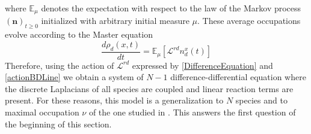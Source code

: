 \documentclass[10pt]{article}
\numberwithin{equation}{section}
\numberwithin{equation}{subsection}
\begin{document}
where $\mathbb{E}_{\mu}$ denotes the expectation with respect to the law of the Markov process $(\bm{n})_{t\geq 0}$ initialized with arbitrary initial measure $\mu$. These average occupations evolve according to the Master equation
\begin{equation}
	\frac{d \rho_{d}(x,t)}{dt}=\mathbb{E}_{\mu}\left[\mathcal{L}^{rd}n_{d}^{x}(t)\right]
\end{equation} 
Therefore, using the action of $\mathcal{L}^{rd}$ expressed by \eqref{DifferenceEquation} and \eqref{actionBDLine} we obtain a system of $N-1$ difference-differential equation where the discrete Laplacians of all species are coupled and linear reaction terms are present. For these reasons, this model is a generalization to $N$ species and to maximal occupation $\nu$ of the one studied in \cite{casini2022uphill}. This answers the first question of the beginning of this section. 
\end{document}
